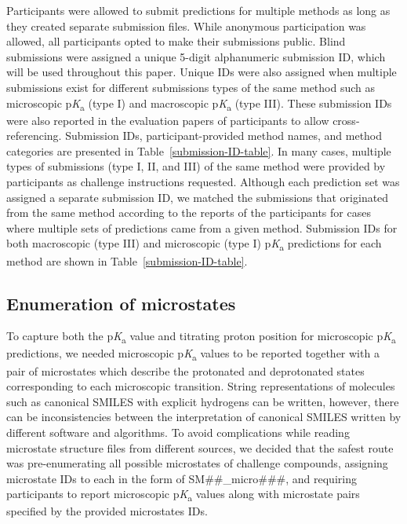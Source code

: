 \documentclass[9pt,lineno,final]{elife}
\newcommand{\pKa}{p\textit{K}\textsubscript{a}}
\begin{document}
Participants were allowed to submit predictions for multiple methods as long as they created separate submission files. 
While anonymous participation was allowed, all participants opted to make their submissions public.
Blind submissions were assigned a unique 5-digit alphanumeric submission ID, which will be used throughout this paper. 
Unique IDs were also assigned when multiple submissions exist for different submissions types of the same method such as microscopic \pKa{} (type I) and macroscopic \pKa{} (type III). 
These submission IDs were also reported in the evaluation papers of participants to allow cross-referencing. 
Submission IDs, participant-provided method names, and method categories are presented in Table~\ref{submission-ID-table}. 
In many cases, multiple types of submissions (type I, II, and III) of the same method were provided by participants as challenge instructions requested. 
Although each prediction set was assigned a separate submission ID, we matched the submissions that originated from the same method according to the reports of the participants for cases where multiple sets of predictions came from a given method.
Submission IDs for both macroscopic (type III) and microscopic (type I) \pKa{} predictions for each method are shown in Table~\ref{submission-ID-table}. 

\subsection{Enumeration of microstates} \label{section-enumeration-of-microstates}

To capture both the \pKa{} value and titrating proton position for microscopic \pKa{} predictions, we needed microscopic \pKa{} values to be reported together with a pair of microstates which describe the protonated and deprotonated states corresponding to each microscopic transition.
String representations of molecules such as canonical SMILES with explicit hydrogens can be written, however, there can be inconsistencies between the interpretation of canonical SMILES written by different software and algorithms. 
To avoid complications while reading microstate structure files from different sources, we decided that the safest route was pre-enumerating all possible microstates of challenge compounds, assigning microstate IDs to each in the form of SM\#\#\_micro\#\#\#, and requiring participants to report microscopic \pKa{} values along with microstate pairs specified by the provided microstates IDs.   
\end{document}
